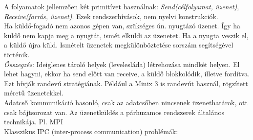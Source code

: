 \documentclass[margin=0px]{article}
\begin{document}
	A folyamatok jellemzően két primitívet használnak: \textit{Send(célfolyamat, üzenet)}, \textit{Receive(forrás, üzenet)}. Ezek rendszerhívások, nem nyelvi konstrukciók. \\
	Ha küldő-fogadó nem azonos gépen van, szükséges ún. nyugtázó üzenet. Így ha küldő nem kapja meg a nyugtát, ismét elküldi az üzenetet. Ha a nyugta veszik el, a küldő újra küld. Ismételt üzenetek megkülönböztetése sorszám segítségével történik. \\
	\textit{Összegzés}: Ideiglenes tároló helyek (levelesláda) létrehozása mindkét helyen. El lehet hagyni, ekkor ha send előtt van receive, a küldő blokkolódik, illetve fordítva. Ezt hívják randevú stratégiának. Például a  Minix 3 is randevút használ, rögzített méretű üzenetekkel. \\
	Adatcső kommunikáció hasonló, csak az adatcsőben nincsenek üzenethatárok, ott csak bájtsorozat van. Az üzenetküldés a párhuzamos rendszerek általános technikája. Pl. MPI \\
	Klasszikus IPC (inter-process communication) problémák:
\end{document}
